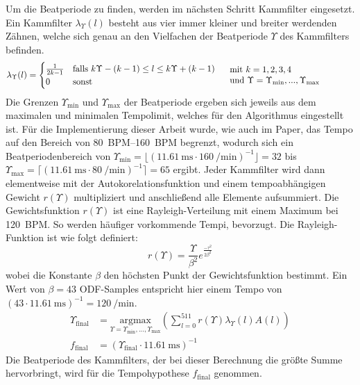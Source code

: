 {{{			%
			Um die Beatperiode zu finden,
				werden im nächsten Schritt Kammfilter eingesetzt.
			Ein Kammfilter $\lambda_\Upsilon(l)$ besteht aus vier immer kleiner und breiter werdenden Zähnen,
				welche sich genau an den Vielfachen der Beatperiode $\Upsilon$ des Kammfilters befinden.
			\begin{equation}
				\lambda_\Upsilon(l) =
				\begin{cases}
					\frac{1}{2k - 1} & \text{falls } k \Upsilon - (k - 1) \leq l \leq k \Upsilon + (k - 1) \\
					0 & \text{sonst}
				\end{cases}
				\hspace{5mm}
				\text{\parbox[c]{5cm}{
					mit $k = 1, 2, 3, 4$ \\
					und $\Upsilon = \Upsilon_\text{min}, ..., \Upsilon_\text{max}$
				}}
			\end{equation}
			Die Grenzen $\Upsilon_\text{min}$ und $\Upsilon_\text{max}$ der Beatperiode ergeben sich jeweils aus dem maximalen und minimalen Tempolimit,
				welches für den Algorithmus eingestellt ist.
			Für die Implementierung dieser Arbeit wurde,
				wie auch im Paper,
				das Tempo auf den Bereich von \SIrange{80}{160}{BPM} begrenzt,
				wodurch sich ein Beatperiodenbereich
				von $\Upsilon_\text{min} = \lfloor(\SI{11.61}{\milli\second} \cdot \SI{160}{\per\minute})^{-1}\rfloor = 32$
				bis $\Upsilon_\text{max} = \lceil(\SI{11.61}{\milli\second} \cdot \SI{80}{\per\minute})^{-1}\rceil = 65$
				ergibt.
			Jeder Kammfilter wird dann elementweise mit der Autokorelationsfunktion und einem tempoabhängigen Gewicht $r(\Upsilon)$ multipliziert
				und anschließend alle Elemente aufsummiert.
			Die Gewichtsfunktion $r(\Upsilon)$ ist eine Rayleigh-Verteilung mit einem Maximum bei \SI{120}{BPM}.
			So werden häufiger vorkommende Tempi, bevorzugt.
			Die Rayleigh-Funktion ist wie folgt definiert:
			\begin{equation}
				r(\Upsilon) = \frac{\Upsilon}{\beta^2}e^{\frac{-\tau^2}{2\beta^2}}
			\end{equation}
			wobei die Konstante $\beta$ den höchsten Punkt der Gewichtsfunktion bestimmt.
			Ein Wert von $\beta = 43$ ODF-Samples entspricht hier einem Tempo von
				$(43 \cdot \SI{11.61}{\milli\second})^{-1} = \SI{120}{\per\minute}$.
			\begin{align}
				\Upsilon_\text{final} &=
					\underset{\Upsilon = \Upsilon_\text{min}, ..., \Upsilon_\text{max}}{\text{argmax}}
					\left( \sum_{l = 0}^{511} r(\Upsilon) \lambda_\Upsilon(l) A(l) \right) \\
				f_\text{final} &= (\Upsilon_\text{final} \cdot \SI{11.61}{\milli\second})^{-1}
			\end{align}
			Die Beatperiode des Kammfilters,
				der bei dieser Berechnung die größte Summe hervorbringt,
				wird für die Tempohypothese $f_\text{final}$ genommen.

}}}
